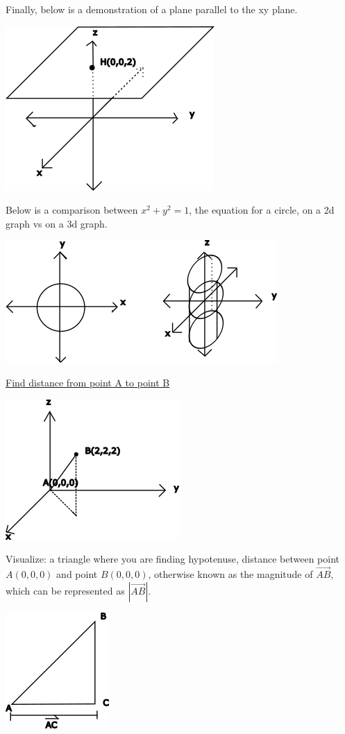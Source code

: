 \documentclass[12pt]{article}
\begin{document}
Finally, below is a demonstration of a plane parallel to the xy plane.

\includegraphics{parallelxy}

Below is a comparison between $x^2+y^2=1$, the equation for a circle, on a 2d graph vs on a 3d graph.

\includegraphics{circleequation}

\underline{Find distance from point A to point B}

\includegraphics{distanceab}

Visualize: a triangle where you are finding hypotenuse, distance between point $A(0,0,0)$ and point $B(0,0,0)$, otherwise known as the magnitude of $\vec{AB}$, which can be represented as $|\vec{AB}|$.

\includegraphics{distanceab-2d}
\end{document}
